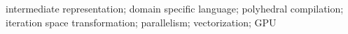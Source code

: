 \documentclass[preprint,10pt,numbers]{sigplanconf}
\begin{document}


\keywords
intermediate representation; domain specific language; polyhedral
compilation; iteration space transformation; parallelism;
vectorization; GPU































\end{document}
